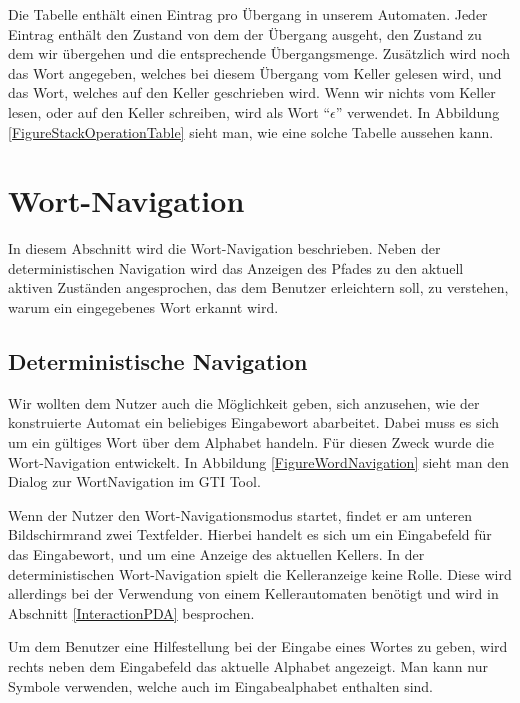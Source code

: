 Die Tabelle enthält einen Eintrag pro Übergang in unserem Automaten. Jeder
Eintrag enthält den Zustand von dem der Übergang ausgeht, den Zustand zu dem wir
übergehen und die entsprechende Übergangsmenge. Zusätzlich wird noch das Wort
angegeben, welches bei diesem Übergang vom Keller gelesen wird, und das Wort,
welches auf den Keller geschrieben wird. Wenn wir nichts vom Keller lesen, oder
auf den Keller schreiben, wird als Wort "`$\epsilon$"' verwendet. In Abbildung
\ref{FigureStackOperationTable} sieht man, wie eine solche Tabelle aussehen
kann.\vspace{10pt}


\section{Wort-Navigation}\label{WordNavigation}

In diesem Abschnitt wird die Wort-Navigation beschrieben. Neben der
deterministischen Navigation wird das Anzeigen des Pfades zu den aktuell
aktiven Zuständen angesprochen, das dem Benutzer erleichtern soll, zu
verstehen, warum ein eingegebenes Wort erkannt wird.


\subsection{Deterministische Navigation}\label{WordNavigationDeterministic}

Wir wollten dem Nutzer auch die Möglichkeit geben, sich anzusehen, wie der
konstruierte Automat ein beliebiges Eingabewort abarbeitet. Dabei muss es sich
um ein gültiges Wort über dem Alphabet handeln. Für diesen Zweck wurde die
Wort-Navigation entwickelt. In Abbildung \ref{FigureWordNavigation}
sieht man den Dialog zur WortNavigation im GTI Tool.\vspace{10pt}

Wenn der Nutzer den Wort-Navigationsmodus startet, findet er am unteren
Bildschirmrand zwei Textfelder. Hierbei handelt es sich um ein Eingabefeld für
das Eingabewort, und um eine Anzeige des aktuellen Kellers. In der
deterministischen Wort-Navigation spielt die Kelleranzeige keine Rolle. Diese
wird allerdings bei der Verwendung von einem Kellerautomaten benötigt und wird
in Abschnitt \ref{InteractionPDA} besprochen.\vspace{10pt}

Um dem Benutzer eine Hilfestellung bei der Eingabe eines Wortes zu geben, wird
rechts neben dem Eingabefeld das aktuelle Alphabet angezeigt. Man kann nur
Symbole verwenden, welche auch im Eingabealphabet enthalten
sind.\vspace{10pt}

